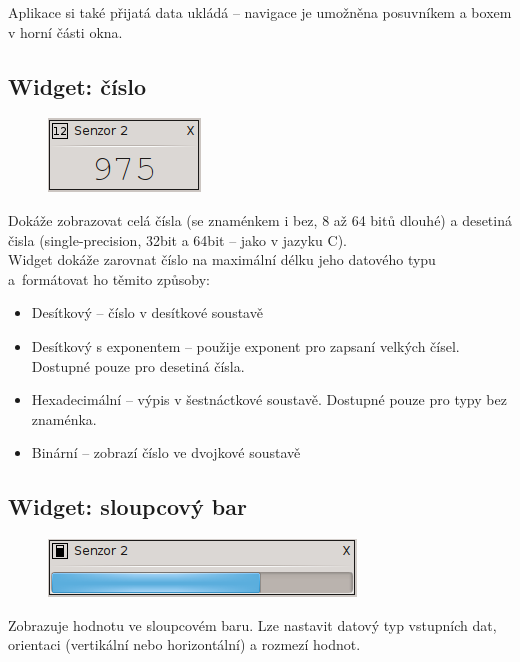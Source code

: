 \documentclass[12pt, a4paper, oneside]{article}
\begin{document}
Aplikace si také přijatá data ukládá -- navigace je umožněna posuvníkem a boxem v horní části okna.

\subsection*{Widget: číslo}
\begin{figure}[h]
\begin{center}
\includegraphics{img/w_num.png}
\end{center}
\end{figure}
Dokáže zobrazovat celá čísla (se znaménkem i bez, 8 až 64 bitů dlouhé) a desetiná čisla (single-precision\cite{float}, 32bit a 64bit -- jako v jazyku C).\\
Widget dokáže zarovnat číslo na maximální délku jeho datového typu\\a~formátovat ho těmito způsoby:
\begin{itemize}
    \item Desítkový -- číslo v desítkové soustavě
    \item Desítkový s exponentem -- použije exponent pro zapsaní velkých čísel. Dostupné pouze pro desetiná čísla.
    \item Hexadecimální -- výpis v šestnáctkové soustavě. Dostupné pouze pro typy bez znaménka. 
    \item Binární -- zobrazí číslo ve dvojkové soustavě
\end{itemize}

\newpage
\subsection*{Widget: sloupcový bar}
\begin{figure}[h]
\begin{center}
\includegraphics{img/w_bar.png}
\end{center}
\end{figure}
Zobrazuje hodnotu ve sloupcovém baru. Lze nastavit datový typ vstupních dat, orientaci (vertikální nebo horizontální) a rozmezí hodnot.
\end{document}
